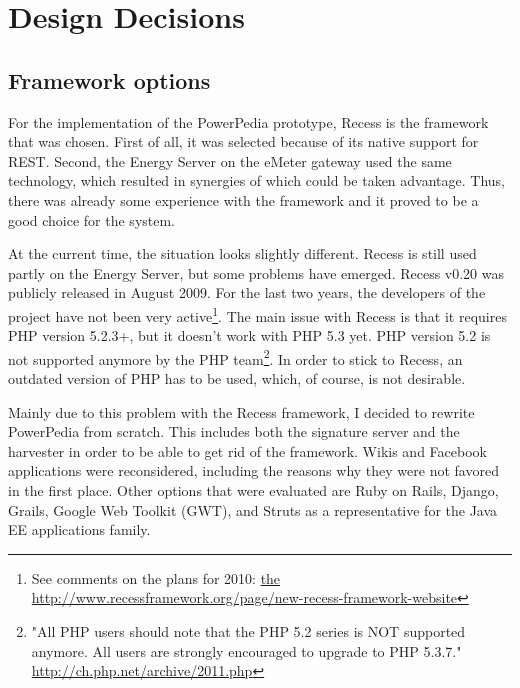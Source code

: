 \section{Design Decisions}

\subsection{Framework options}\label{sec:framework_options}
For the implementation of the PowerPedia prototype, Recess is the framework that was chosen. First of all, it was selected because of its native support for REST. Second, the Energy Server on the eMeter gateway used the same technology, which resulted in synergies of which could be taken advantage. Thus, there was already some experience with the framework and it proved to be a good choice for the system.

At the current time, the situation looks slightly different. Recess is still used partly on the Energy Server, but some problems have emerged. Recess v0.20 was publicly released in August 2009. For the last two years, the developers of the project have not been very active\footnote{See comments on the plans for 2010: \url{the http://www.recessframework.org/page/new-recess-framework-website}}. The main issue with Recess is that it requires PHP version 5.2.3+, but it doesn't work with PHP 5.3 yet. PHP version 5.2 is not supported anymore by the PHP team\footnote{"All PHP users should note that the PHP 5.2 series is NOT supported anymore. All users are strongly encouraged to upgrade to PHP 5.3.7." \url{http://ch.php.net/archive/2011.php}}. In order to stick to Recess, an outdated version of PHP has to be used, which, of course, is not desirable.  

Mainly due to this problem with the Recess framework, I decided to rewrite PowerPedia from scratch. This includes both the signature server and the harvester in order to be able to get rid of the framework. 
Wikis and Facebook applications were reconsidered, including the reasons why they were not favored in the first place. Other options that were evaluated are Ruby on Rails, Django, Grails, Google Web Toolkit (GWT), and Struts as a representative for the Java EE applications family.    

